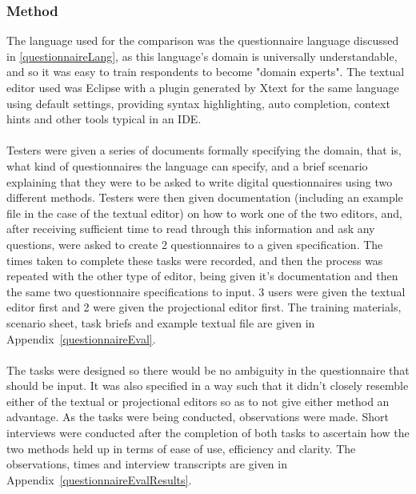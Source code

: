 \documentclass{article}
\begin{document}
{\subsubsection{Method}
The language used for the comparison was the questionnaire language discussed in \ref{questionnaireLang}, as this language's domain is universally understandable, and so it was easy to train respondents to become "domain experts". The textual editor used was Eclipse with a plugin generated by Xtext for the same language using default settings, providing syntax highlighting, auto completion, context hints and other tools typical in an IDE.
\\
\\
Testers were given a series of documents formally specifying the domain, that is, what kind of  questionnaires the language can specify, and a brief scenario explaining that they were to be asked to write digital questionnaires using two different methods. Testers were then given documentation (including an example file in the case of the textual editor) on how to work one of the two editors, and, after receiving sufficient time to read through this information and ask any questions, were asked to create 2 questionnaires to a given specification. The times taken to complete these tasks were recorded, and then the process was repeated with the other type of editor, being given it's documentation and then the same two questionnaire specifications to input. 3 users were given the textual editor first and 2 were given the projectional editor first. The training materials, scenario sheet, task briefs and example textual file are given in Appendix~\ref{questionnaireEval}.
\\
\\
The tasks were designed so there would be no ambiguity in the questionnaire that should be input. It was also specified in a way such that it didn't closely resemble either of the textual or projectional editors so as to not give either method an advantage. As the tasks were being conducted, observations were made. Short interviews were conducted after the completion of both tasks to ascertain how the two methods held up in terms of ease of use, efficiency and clarity. The observations, times and interview transcripts are given in Appendix~\ref{questionnaireEvalResults}.

}
\end{document}
